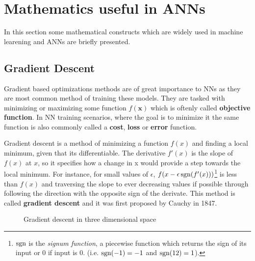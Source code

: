 \section{Mathematics useful in ANNs}

In this section some mathematical constructs which are widely
used in machine learening and ANNs are briefly presented.

\subsection{Gradient Descent}\label{sec:gradient_descent}

Gradient based optimizations methods are of great importance to
NNs as they are most common method of training these models. They
are tasked with minimizing or maximizing some function $f(\bm{x})$ which
is oftenly called \textbf{objective function}. In NN training
scenarios, where the goal is to minimize it the same function is also
commonly called a \textbf{cost}, \textbf{loss} or \textbf{error}
function\cite{book:Goodfellow}.

Gradient descent is a method of minimizing a function $f(x)$ and
finding a local minimum, given that its differentiable. The
derivative $f'(x)$ is the slope of $f(x)$ at $x$, so it specifies
how a change in x would provide a step towards the local minimum. For instance,
for small values of $\epsilon$, $f(x - \epsilon \operatorname{sgn} (f'(x)))$\footnote{
  $\operatorname{sgn}$ is the \textit{signum function}, a piecewise function which returns
  the sign of its input or 0 if input is 0. (i.e. $\operatorname{sgn}(-1) = -1$ and $\operatorname{sgn}(12) = 1$).
} is less than $f(x)$ and traversing the slope to ever decreasing
values if possible through following the direction with the opposite
sign of the derivate. This method is called \textbf{gradient descent}
and it was first proposed by Cauchy \cite{article:Cauchy} in 1847.
\begin{figure}[h!]
  \centering
  
  \caption{Gradient descent in three dimensional space}
  \label{fig:gradient_descent_2d}
\end{figure}

